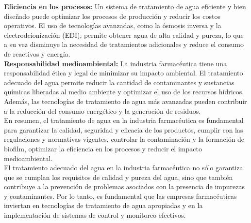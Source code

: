\textbf{Eficiencia en los procesos:} Un sistema de tratamiento de agua eficiente y bien diseñado puede optimizar los procesos de producción y reducir los costos operativos. El uso de tecnologías avanzadas, como la ósmosis inversa y la electrodeionización (EDI), permite obtener agua de alta calidad y pureza, lo que a su vez disminuye la necesidad de tratamientos adicionales y reduce el consumo de reactivos y energía.\\

\textbf{Responsabilidad medioambiental:} La industria farmacéutica tiene una responsabilidad ética y legal de minimizar su impacto ambiental. El tratamiento adecuado del agua permite reducir la cantidad de contaminantes y sustancias químicas liberadas al medio ambiente y optimizar el uso de los recursos hídricos. Además, las tecnologías de tratamiento de agua más avanzadas pueden contribuir a la reducción del consumo energético y la generación de residuos.\\

En resumen, el tratamiento de agua en la industria farmacéutica es fundamental para garantizar la calidad, seguridad y eficacia de los productos, cumplir con las regulaciones y normativas vigentes, controlar la contaminación y la formación de biofilm, optimizar la eficiencia en los procesos y reducir el impacto medioambiental.\\

El tratamiento adecuado del agua en la industria farmacéutica no sólo garantiza que se cumplan los requisitos de calidad y pureza del agua, sino que también contribuye a la prevención de problemas asociados con la presencia de impurezas y contaminantes. Por lo tanto, es fundamental que las empresas farmacéuticas inviertan en tecnologías de tratamiento de agua apropiadas y en la implementación de sistemas de control y monitoreo efectivos.\\ 

